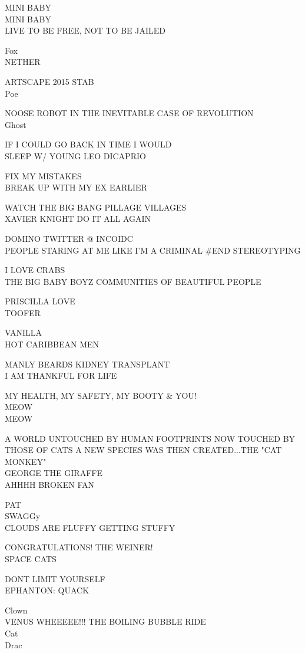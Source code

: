 \documentclass[10pt,letterpaper]{article}
\begin{document}
MINI BABY\\
MINI BABY\\
LIVE TO BE FREE, NOT TO BE JAILED

Fox\\
NETHER

ARTSCAPE 2015 STAB\\
Poe

NOOSE ROBOT IN THE INEVITABLE CASE OF REVOLUTION\\
Ghost

IF I COULD GO BACK IN TIME I WOULD\\
SLEEP W/ YOUNG LEO DICAPRIO

FIX MY MISTAKES\\
BREAK UP WITH MY EX EARLIER

WATCH THE BIG BANG PILLAGE VILLAGES\\
XAVIER KNIGHT DO IT ALL AGAIN

DOMINO TWITTER @ INCOIDC\\
PEOPLE STARING AT ME LIKE I'M A CRIMINAL \#END STEREOTYPING

I LOVE CRABS\\
THE BIG BABY BOYZ COMMUNITIES OF BEAUTIFUL PEOPLE

PRISCILLA LOVE\\
TOOFER

VANILLA\\
HOT CARIBBEAN MEN

MANLY BEARDS KIDNEY TRANSPLANT\\
I AM THANKFUL FOR LIFE

MY HEALTH, MY SAFETY, MY BOOTY \& YOU!\\
MEOW\\
MEOW

A WORLD UNTOUCHED BY HUMAN FOOTPRINTS NOW TOUCHED BY THOSE OF CATS A NEW SPECIES WAS THEN CREATED...THE "CAT MONKEY"\\
GEORGE THE GIRAFFE\\
AHHHH BROKEN FAN

PAT\\
SWAGGy\\
CLOUDS ARE FLUFFY GETTING STUFFY

CONGRATULATIONS!  THE WEINER!\\
SPACE CATS

DONT LIMIT YOURSELF\\
EPHANTON: QUACK

Clown\\
VENUS WHEEEEE!!! THE BOILING BUBBLE RIDE\\
Cat\\
Drac
\end{document}
